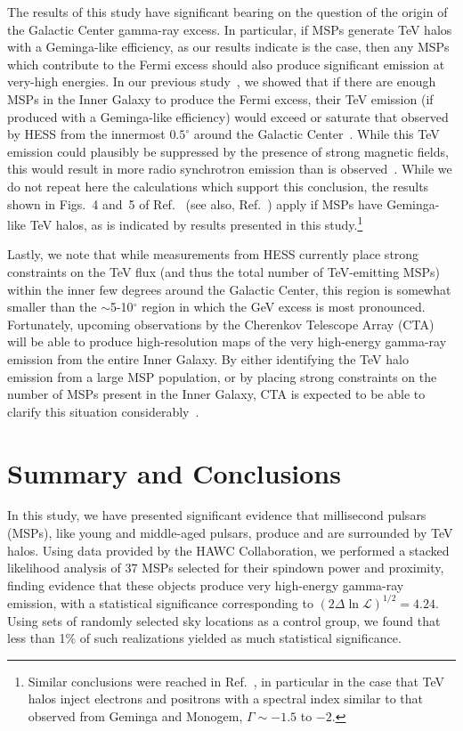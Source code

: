 \documentclass[aps,prd,twocolumn,amsmath,superscriptaddress,amssymb,showpacs,floatfix,nofootinbib,longbibliography,preprintnumbers]{revtex4-1}
\begin{document}
The results of this study have significant bearing on the question of the origin of the Galactic Center gamma-ray excess. In particular, if MSPs generate TeV halos with a Geminga-like efficiency, as our results indicate is the case, then any MSPs which contribute to the Fermi excess should also produce significant emission at very-high energies. In our previous study~\cite{Hooper:2018fih}, we showed that if there are enough MSPs in the Inner Galaxy to produce the Fermi excess, their TeV emission (if produced with a Geminga-like efficiency) would exceed or saturate that observed by HESS from the innermost $0.5^{\circ}$ around the Galactic Center~\cite{Abramowski:2016mir}. While this TeV emission could plausibly be suppressed by the presence of strong magnetic fields, this would result in more radio synchrotron emission than is observed~\cite{Hooper:2018fih}. While we do not repeat here the calculations which support this conclusion, the results shown in Figs.~4 and~5 of Ref.~\cite{Hooper:2018fih} (see also, Ref.~\cite{Hooper:2017rzt}) apply if MSPs have Geminga-like TeV halos, as is indicated by results presented in this study.\footnote{Similar conclusions were reached in Ref.~\cite{Song:2019nrx}, in particular in the case that TeV halos inject electrons and positrons with a spectral index similar to that observed from Geminga and Monogem, $\Gamma \sim -1.5$ to $-2$.}

Lastly, we note that while measurements from HESS currently place strong constraints on the TeV flux (and thus the total number of TeV-emitting MSPs) within the inner few degrees around the Galactic Center, this region is somewhat smaller than the $\sim$5-10$^\circ$ region in which the GeV excess is most pronounced. Fortunately, upcoming observations by the Cherenkov Telescope Array (CTA)~\cite{CTAConsortium:2018tzg} will be able to produce high-resolution maps of the very high-energy gamma-ray emission from the entire Inner Galaxy. By either identifying the TeV halo emission from a large MSP population, or by placing strong constraints on the number of MSPs present in the Inner Galaxy, CTA is expected to be able to clarify this situation considerably~\cite{Macias:2021boz}. 


\section{Summary and Conclusions}

In this study, we have presented significant evidence that millisecond pulsars (MSPs), like young and middle-aged pulsars, produce and are surrounded by TeV halos. Using data provided by the HAWC Collaboration, we performed a stacked likelihood analysis of 37 MSPs selected for their spindown power and proximity, finding evidence that these objects produce very high-energy gamma-ray emission, with a statistical significance corresponding to $(2\Delta \ln \mathcal{L})^{1/2} = 4.24$. Using sets of randomly selected sky locations as a control group, we found that less than 1\% of such realizations yielded as much statistical significance. 
\end{document}
